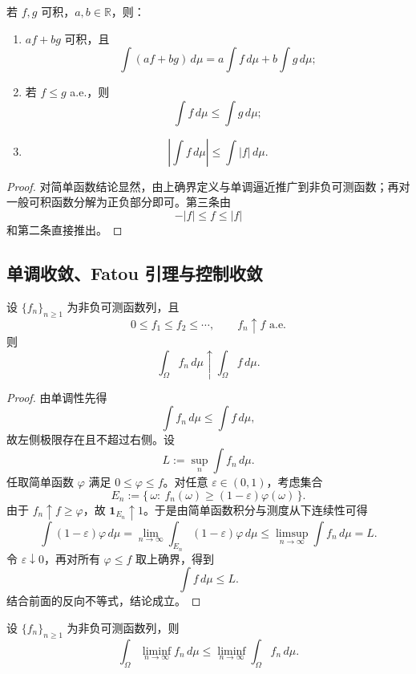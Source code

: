 \begin{proposition}[积分的基本性质]\label{prop:integral-basic-properties}
若 $f,g$ 可积，$a,b\in \mathbb R$，则：
\begin{enumerate}
  \item $af+bg$ 可积，且
  \[
  \int (af+bg)\,d\mu=a\int f\,d\mu+b\int g\,d\mu;
  \]
  \item 若 $f\le g$ a.e.，则
  \[
  \int f\,d\mu\le \int g\,d\mu;
  \]
  \item
  \[
  \left|\int f\,d\mu\right|\le \int |f|\,d\mu.
  \]
\end{enumerate}
\end{proposition}

\begin{proof}
对简单函数结论显然，由上确界定义与单调逼近推广到非负可测函数；再对一般可积函数分解为正负部分即可。第三条由
\[
-|f|\le f\le |f|
\]
和第二条直接推出。
\end{proof}

\subsection{单调收敛、Fatou 引理与控制收敛}

\begin{theorem}[单调收敛定理]\label{thm:monotone-convergence}
设 $\{f_n\}_{n\ge1}$ 为非负可测函数列，且
\[
0\le f_1\le f_2\le \cdots,\qquad f_n\uparrow f \text{ a.e.}
\]
则
\[
\int_\Omega f_n\,d\mu \uparrow \int_\Omega f\,d\mu.
\]
\end{theorem}

\begin{proof}
由单调性先得
\[
\int f_n\,d\mu\le \int f\,d\mu,
\]
故左侧极限存在且不超过右侧。设
\[
L:=\sup_n \int f_n\,d\mu.
\]
任取简单函数 $\varphi$ 满足 $0\le \varphi\le f$。对任意 $\varepsilon\in(0,1)$，考虑集合
\[
E_n:=\{\,\omega:\ f_n(\omega)\ge (1-\varepsilon)\varphi(\omega)\,\}.
\]
由于 $f_n\uparrow f\ge \varphi$，故 $\mathbf 1_{E_n}\uparrow 1$。于是由简单函数积分与测度从下连续性可得
\[
\int (1-\varepsilon)\varphi\,d\mu
=
\lim_{n\to\infty}\int_{E_n}(1-\varepsilon)\varphi\,d\mu
\le
\limsup_{n\to\infty}\int f_n\,d\mu
=L.
\]
令 $\varepsilon\downarrow 0$，再对所有 $\varphi\le f$ 取上确界，得到
\[
\int f\,d\mu\le L.
\]
结合前面的反向不等式，结论成立。
\end{proof}

\begin{lemma}[Fatou 引理]\label{lem:fatou}
设 $\{f_n\}_{n\ge1}$ 为非负可测函数列，则
\[
\int_\Omega \liminf_{n\to\infty} f_n\,d\mu
\le
\liminf_{n\to\infty}\int_\Omega f_n\,d\mu.
\]
\end{lemma}

